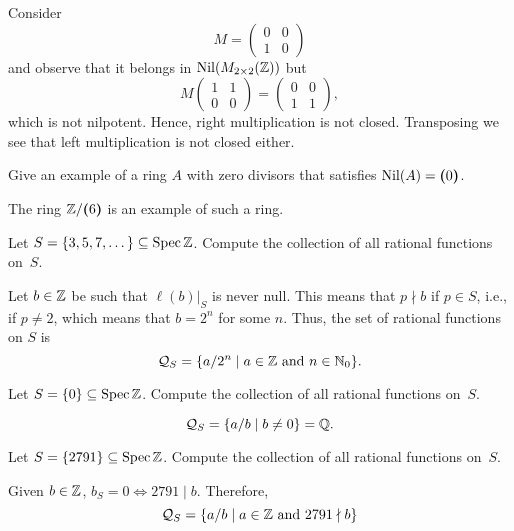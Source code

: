 \begin{solution}
    Consider
    $$
        M=\begin{pmatrix}
            0   &0\\
            1   &0      
        \end{pmatrix}
    $$
    and observe that it belongs in $\operatorname{Nil}(M_{2\times2}(\mathbb{Z}))$ but
    $$
        M\begin{pmatrix}
            1   &1\\
            0   &0
        \end{pmatrix}
        =
        \begin{pmatrix}
            0   &0\\
            1   &1
        \end{pmatrix},
    $$
    which is not nilpotent. Hence, right multiplication is not closed. Transposing we see that left multiplication is not closed either.
\end{solution}

\begin{exr}
    Give an example of a ring\/ $A$ with zero divisors that satisfies\/ $\operatorname{Nil}(A)=\textrm{\boldmath$($}0\textrm{\boldmath$)$}$.
\end{exr}

\begin{solution}
    The ring $\mathbb{Z}/\textrm{\boldmath$($}6\textrm{\boldmath$)$}$ is an example of such a ring. 
\end{solution}

\begin{exr}
    Let\/ $S =\{3, 5, 7, \dots\}\subseteq\operatorname{Spec}\mathbb{Z}$. Compute the collection of all rational functions on\/~$S$.
\end{exr}

\begin{solution}
    Let $b\in\mathbb{Z}$ be such that $\ell(b)|_S$ is never null. This means that $p\nmid b$ if $p\in S$, i.e., if $p\ne2$, which means that $b=2^n$ for some $n$. Thus, the set of rational functions on $S$ is
    $$
       \mathcal Q_S = \{a/2^n\mid a\in\mathbb{Z}\text{ and }n\in\mathbb{N}_0\}.
    $$
\end{solution}

\begin{exr}
    Let\/ $S=\{0\}\subseteq\operatorname{Spec}\mathbb{Z}$. Compute the collection of all rational functions on\/~$S$.
\end{exr}

\begin{solution}
    $$
        \mathcal Q_S = \{a/b\mid b\ne0\}=\mathbb{Q}.
    $$
\end{solution}

\begin{exr}
    Let\/ $S=\{2791\}\subseteq\operatorname{Spec}\mathbb{Z}$. Compute the collection of all rational functions on\/~$S$.
\end{exr}

\begin{solution}
    Given $b\in\mathbb{Z}$, $b_S=0\iff 2791\mid b$. Therefore,
    $$
        \mathcal Q_S = \{a/b\mid a\in\mathbb{Z}\text{ and } 2791\nmid b\}
    $$
\end{solution}

